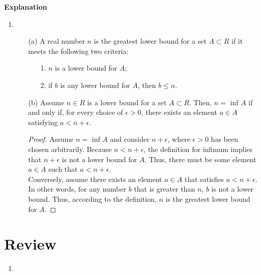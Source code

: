 \textbf{Explanation}\\
\begin{enumerate}
  \item 
    \begin{enumerate}
      \item[(a)] A real number $n$ is the greatest lower bound for a set $A \subset R$ if it meets the following two criteria:
        \begin{enumerate}
          \item[1.] $n$ is a lower bound for $A$;
          \item[2.] if $b$ is any lower bound for $A$, then $b \leq n$. 
        \end{enumerate}
      \item[(b)] Assume $n \in R$ is a lower bound for a set $A \subset R$. Then, $n = \text{ inf } A$ if and only if, for every choice of $\epsilon > 0$, there exists an element $a \in A$ satisfying $a < n + \epsilon$. \\

        \begin{proof}
          Assume $n = \text{ inf } A$ and consider $n + \epsilon$, where $\epsilon > 0$ has been chosen arbitrarily. Because $n < n + \epsilon$, the definition for infimum implies that $n + \epsilon$ is not a lower bound for $A$. Thus, there must be some element $a \in A$ such that $a < n + \epsilon$.\\
          Conversely, assume there exists an element $a \in A$ that satisfies $a < n + \epsilon$. In other words, for any number $b$ that is greater than $n$, $b$ is not a lower bound. Thus, according to the definition, $n$ is the greatest lower bound for $A$. 
        \end{proof}
    \end{enumerate}
\end{enumerate}

\section*{Review}
\begin{enumerate}
  \item 
\end{enumerate}


